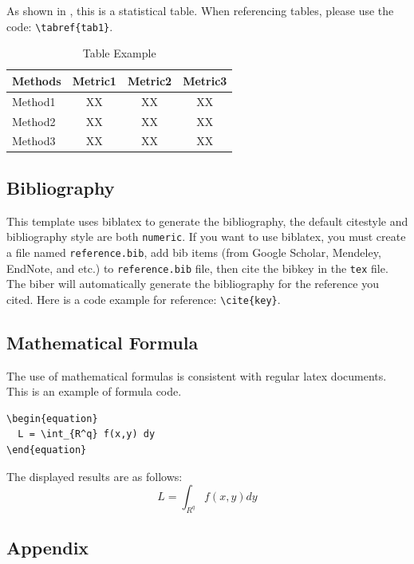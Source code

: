 \documentclass[11pt,en]{elegantpaper}
\begin{document}
As shown in , this is a statistical table. When referencing tables, please use the code: \verb|\tabref{tab1}|.
\begin{table}[!htb]
    \centering
    \caption{Table Example}
    \begin{tabular}{l|c|c|c}
        \toprule
        \textbf{Methods} & \textbf{Metric1}  &  \textbf{Metric2} &  \textbf{Metric3}\\
        \hline 
        Method1~\cite{en1}& XX & XX& XX\\
        \hline
        Method2~\cite{en2}& XX & XX& XX\\
        \hline
        Method3~\cite{en3}& XX & XX& XX\\
        \bottomrule 
    \end{tabular}
    \label{tab1}
\end{table}


\subsection{Bibliography}

This template uses biblatex to generate the bibliography, the default citestyle and bibliography style are both \lstinline{numeric}. If you want to use biblatex, you must create a file named \lstinline{reference.bib}, add bib items (from Google Scholar, Mendeley, EndNote, and etc.) to \lstinline{reference.bib} file, then cite the bibkey in the \lstinline{tex} file. The biber will automatically generate the bibliography for the reference you cited. Here is a code example for reference: \verb|\cite{key}|.

\subsection{Mathematical Formula}

The use of mathematical formulas is consistent with regular latex documents. This is an example of formula code.
\begin{lstlisting}
\begin{equation}
  L = \int_{R^q} f(x,y) dy
\end{equation}
\end{lstlisting}

The displayed results are as follows:
\begin{equation}
  L = \int_{R^q} f(x,y) dy
\end{equation}


\subsection{Appendix}
\end{document}
